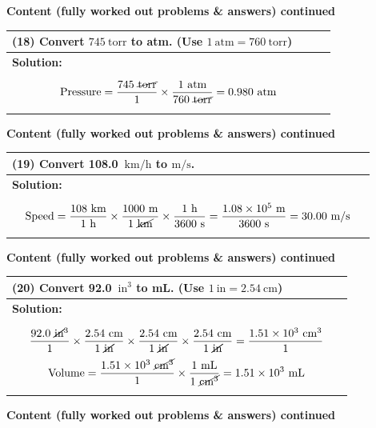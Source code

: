 \documentclass{article}
\begin{document}
\noindent
{\large \textbf{Content (fully worked out problems \& answers) continued}} \\[0.2em]
\begin{tabular}{|p{0.9\linewidth}|}
\hline
\vspace{0.2cm}

\textbf{(18)} Convert $745~\text{torr}$ to atm. (Use $1~\text{atm}=760~\text{torr}$) \\
\hline
\textbf{Solution:} \\
\[
\text{Pressure} = \frac{745~\cancel{\text{torr}}}{1} \times \frac{1~\text{atm}}{760~\cancel{\text{torr}}}
= 0.980~\text{atm}
\] \\
\hline
\end{tabular}
\newpage
\noindent
{\large \textbf{Content (fully worked out problems \& answers) continued}} \\[0.2em]
\begin{tabular}{|p{0.9\linewidth}|}
\hline
\vspace{0.2cm}

\textbf{(19)} Convert 108.0~$\text{km/h}$ to $\text{m/s}$. \\
\hline
\textbf{Solution:} \\
\[
\text{Speed} = \frac{108~\text{km}}{1~\text{h}} \times \frac{1000~\text{m}}{1~\cancel{\text{km}}} \times \frac{1~\text{h}}{3600~\text{s}} = \frac{1.08 \times 10^5~\text{m}}{3600~\text{s}}
= 30.00~\text{m/s}
\]
\\
\hline
\end{tabular}
\newpage
\noindent
{\large \textbf{Content (fully worked out problems \& answers) continued}} \\[0.2em]
\begin{tabular}{|p{0.9\linewidth}|}
\hline
\vspace{0.2cm}

\textbf{(20)} Convert 92.0~$\text{in}^3$ to mL. (Use $1~\text{in}=2.54~\text{cm}$) \\
\hline
\textbf{Solution:} \\
\[
\frac{92.0~\cancel{\text{in}}^3}{1} \times \frac{2.54~\text{cm}}{1~\cancel{\text{in}}} \times \frac{2.54~\text{cm}}{1~\cancel{\text{in}}} \times \frac{2.54~\text{cm}}{1~\cancel{\text{in}}} = \frac{1.51 \times 10^3~\text{cm}^3}{1}
\]
\[
\text{Volume} = \frac{1.51 \times 10^3~\cancel{\text{cm}^3}}{1} \times \frac{1~\text{mL}}{1~\cancel{\text{cm}^3}} = 1.51 \times 10^3~\text{mL}
\]
\\
\hline
\end{tabular}
\newpage
\noindent
{\large \textbf{Content (fully worked out problems \& answers) continued}} \\[0.2em]
\end{document}
